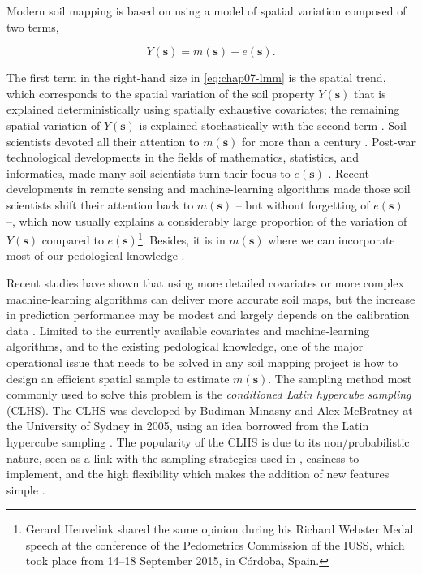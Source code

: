 Modern soil mapping is based on using a model of spatial variation composed of two terms, 

\begin{equation}
 Y(\boldsymbol{s}) = m(\boldsymbol{s}) + e(\boldsymbol{s}).
\end{equation}\label{eq:chap07-lmm}

\def\footgerard{\footnote{Gerard Heuvelink shared the same opinion during his Richard Webster Medal speech at 
the conference of the Pedometrics Commission of the IUSS, which took place from 14--18 September 2015, in 
Córdoba, Spain.}}

\noindent The first term in the right-hand size in \autoref{eq:chap07-lmm} is the spatial trend, 
which corresponds to the spatial variation of the soil property $Y(\boldsymbol{s})$ that is explained 
deterministically using spatially exhaustive covariates; the remaining spatial variation of 
$Y(\boldsymbol{s})$ is explained stochastically with the second term \cite{Cressie1993}. Soil scientists 
devoted all their attention to $m(\boldsymbol{s})$ for more than a century \cite{Jenny1961, Florinsky2012}. 
Post-war technological developments in the fields of mathematics, statistics, and informatics, made many soil 
scientists turn their focus to $e(\boldsymbol{s})$ \cite{WebsterEtAl1990}. Recent developments in remote 
sensing and machine-learning algorithms made those soil scientists shift their attention back to 
$m(\boldsymbol{s})$ \cite{MooreEtAl1993} -- but without forgetting of $e(\boldsymbol{s})$ \cite{OdehEtAl1994} 
--, which now usually explains a considerably large proportion of the variation of $Y(\boldsymbol{s})$ 
compared to $e(\boldsymbol{s})$\footgerard. Besides, it is in $m(\boldsymbol{s})$ where we can incorporate most 
of our pedological knowledge \cite{Lark2012}.

Recent studies have shown that using more detailed covariates or more complex machine-learning algorithms can 
deliver more accurate soil maps, but the increase in prediction performance may be modest 
\cite{Samuel-RosaEtAl2015} and largely depends on the calibration data \cite{HeungEtAl2016}. Limited to the 
currently available covariates and machine-learning algorithms, and to the existing pedological knowledge, one 
of the major operational issue that needs to be solved in any soil mapping project is how to design an 
efficient spatial sample to estimate $m(\boldsymbol{s})$. The sampling method most commonly used to solve this 
problem is the \emph{conditioned Latin hypercube sampling} (CLHS). The CLHS was developed by Budiman Minasny 
and Alex McBratney at the University of Sydney in 2005, using an idea borrowed from the Latin hypercube 
sampling \cite{McKayEtAl1979, MinasnyEtAl2006b}. The popularity of the CLHS is due to its non\-/probabilistic 
nature, seen as a link with the sampling strategies used in , easiness to 
implement, and the high flexibility which makes the addition of new features simple \cite{MinasnyEtAl2010a, 
RoudierEtAl2012, MulderEtAl2013, CarvalhoJuniorEtAl2014, CliffordEtAl2014}.

